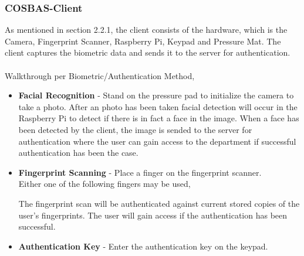 \subsubsection{COSBAS-Client}
As mentioned in section 2.2.1, the client consists of the hardware, which is the Camera, Fingerprint Scanner, Raspberry Pi, Keypad and Pressure Mat. The client captures the biometric data and sends it to the server for authentication.\\
\\
Walkthrough per Biometric/Authentication Method,
\begin{itemize}
		\item{\textbf{Facial Recognition } - Stand on the pressure pad to initialize the camera to take a photo. After an photo has been taken facial detection will occur in the Raspberry Pi to detect if there is in fact a face in the image. When a face has been detected by the client, the image is sended to the server for authentication where the user can gain access to the department if successful authentication has been the case.} 
		\item{\textbf{Fingerprint Scanning} - Place a finger on the fingerprint scanner. \\
			Either one of the following fingers may be used, 

			The fingerprint scan will be authenticated against current stored copies of the user's fingerprints. The user will gain access if the authentication has been successful.
			}

	\item{\textbf{Authentication Key} - Enter the authentication key on the keypad. 


		}
	\end{itemize}

